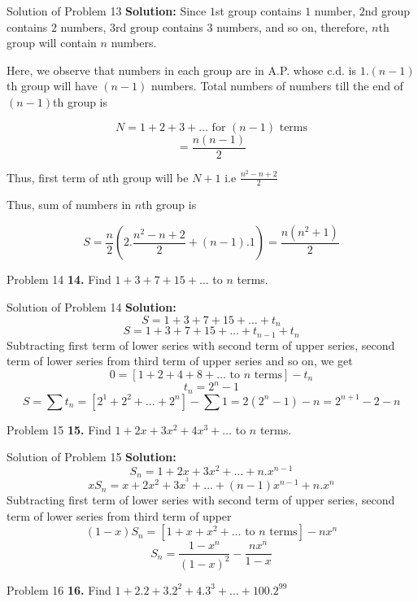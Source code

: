 \documentclass[aspectratio=1610,8pt]{beamer}
\begin{document}
\begin{frame}{Solution of Problem 13}
  \textbf{Solution:} Since $1$st group contains $1$ number, $2$nd group contains $2$ numbers, $3$rd group contains $3$ numbers, and
  so on, therefore, $n$th group will contain $n$ numbers.

  Here, we observe that numbers in each group are in A.P. whose c.d. is $1. (n - 1)$th group will have $(n - 1)$ numbers. Total
  numbers of numbers till the end of $(n - 1)$th group is

  $$N=1 + 2 + 3 +\ldots \text{~for~} (n - 1) \text{~terms}$$
  $$= \frac{n(n - 1)}{2}$$

  Thus, first term of nth group will be $N + 1$ i.e $\frac{n^2 - n + 2}{2}$

  Thus, sum of numbers in $n$th group is

  $$S = \frac{n}{2}\left(2.\frac{n^2 - n + 2}{2} + (n - 1).1\right) = \frac{n(n^2 + 1)}{2}$$
\end{frame}
\begin{frame}{Problem 14}
  \textbf{14.} Find $1 + 3 + 7 + 15 + \ldots$ to $n$ terms.
\end{frame}
\begin{frame}{Solution of Problem 14}
  \textbf{Solution:} $$S = 1 + 3 + 7 + 15 + \ldots + t_n$$
  $$S = 1 + 3 + 7 + 15 + \ldots + t_{n - 1} + t_n$$
  Subtracting first term of lower series with second term of upper series, second term of lower series from third term of upper
  series and so on, we get
  $$0 = [1 + 2 + 4 + 8 + \ldots\text{~to~}n\text{~terms}] - t_n$$
  $$t_n = 2^n - 1$$
  $$S = \sum t_n = [2^1 + 2^2 + \ldots +2^n] - \sum 1 = 2(2^n - 1) - n = 2^{n + 1} - 2 - n$$
\end{frame}
\begin{frame}{Problem 15}
  \textbf{15.} Find $1 + 2x + 3x^2 + 4x^3 + \ldots$ to $n$ terms.
\end{frame}
\begin{frame}{Solution of Problem 15}
  \textbf{Solution:}
  $$S_n = 1 + 2x + 3x^2 + \ldots + n.x^{n- 1}$$
  $$xS_n = x + 2x^2 + 3x^^3 + \ldots + (n - 1)x^{n-1}  + n.x^n$$
  Subtracting first term of lower series with second term of upper series, second term of lower series from third term of upper
  $$(1 - x)S_n = [1 + x + x^2 + \ldots \text{~to~}n\text{~terms}] -nx^n$$
  $$S_n = \frac{1 - x^n}{(1 - x)^2} - \frac{nx^n}{1 - x}$$
\end{frame}
\begin{frame}{Problem 16}
  \textbf{16.} Find $1 + 2.2 + 3.2^2 + 4.3^3 + \ldots + 100.2^{99}$
\end{frame}
\end{document}
